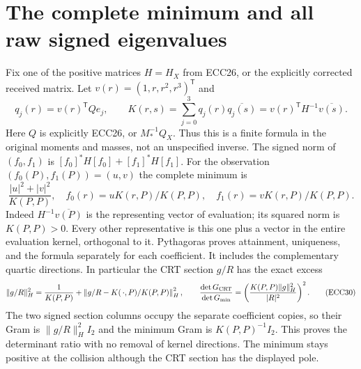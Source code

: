 \documentclass[11pt]{article}
\begin{document}
\section{The complete minimum and all raw signed eigenvalues}
Fix one of the positive matrices $H=H_X$ from ECC26, or the explicitly
corrected received matrix. Let $v(r)=(1,r,r^2,r^3)^{\mathsf T}$ and
\begin{equation}
 q_j(r)=v(r)^{\mathsf T}Qe_j,\qquad
 K(r,s)=\sum_{j=0}^3q_j(r)\overline{q_j(s)}
       =v(r)^{\mathsf T}H^{-1}\overline{v(s)}.
 \tag{ECC28}
\end{equation}
Here $Q$ is explicitly ECC26, or $M_*^{-1}Q_X$. Thus this is a finite
formula in the original moments and masses, not an unspecified inverse.
The signed norm of $(f_0,f_1)$ is $[f_0]^*H[f_0]+[f_1]^*H[f_1]$.
For the observation $(f_0(P),f_1(P))=(u,v)$ the complete minimum is
\begin{equation}
 \frac{|u|^2+|v|^2}{K(P,P)},\quad
 f_0(r)=uK(r,P)/K(P,P),\quad f_1(r)=vK(r,P)/K(P,P).
 \tag{ECC29}
\end{equation}
Indeed $H^{-1}\overline{v(P)}$ is the representing vector of evaluation;
its squared norm is $K(P,P)>0$. Every other representative is this
one plus a vector in the entire evaluation kernel, orthogonal to it.
Pythagoras proves attainment, uniqueness, and the formula separately
for each coefficient. It includes the complementary quartic directions.
In particular the CRT section $g/R$ has the exact excess
\begin{equation}
 \|g/R\|_H^2=\frac1{K(P,P)}+
 \left\|g/R-K(\,\cdot,P)/K(P,P)\right\|_H^2,\qquad
 \frac{\det G_{\rm CRT}}{\det G_{\min}}=
 \left(\frac{K(P,P)\|g\|_H^2}{|R|^2}\right)^2.
 \tag{ECC30}
\end{equation}
The two signed section columns occupy the separate coefficient copies,
so their Gram is $\|g/R\|_H^2I_2$ and the minimum Gram is
$K(P,P)^{-1}I_2$. This proves the determinant ratio with no removal of
kernel directions. The minimum stays positive at the collision although
the CRT section has the displayed pole.
\end{document}
